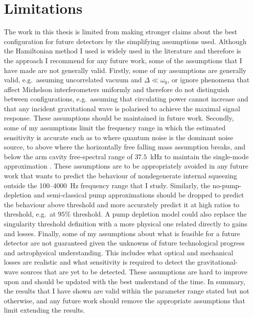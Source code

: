 \section{Limitations}

The work in this thesis is limited from making stronger claims about the best configuration for future detectors by the simplifying assumptions used. Although the Hamiltonian method I used is widely used in the literature and therefore is the approach I recommend for any future work, some of the assumptions that I have made are not generally valid.
Firstly, some of my assumptions are generally valid, e.g.\ assuming uncorrelated vacuum and $\Delta\ll\omega_0$, or ignore phenomena that affect Michelson interferometers uniformly and therefore do not distinguish between configurations, e.g.\ assuming that circulating power cannot increase and that any incident gravitational wave is polarised to achieve the maximal signal response. These assumptions should be maintained in future work.
Secondly, some of my assumptions limit the frequency range in which the estimated sensitivity is accurate such as to where quantum noise is the dominant noise source, to above where  the horizontally free falling mass assumption breaks, and below the arm cavity free-spectral range of $37.5$~kHz to maintain the single-mode approximation . These assumptions are to be appropriately avoided in any future work that wants to predict the behaviour of nondegenerate internal squeezing outside the 100--4000~Hz frequency range that I study. Similarly, the no-pump-depletion and semi-classical pump approximations should be dropped to predict the behaviour above threshold and more accurately predict it at high ratios to threshold, e.g.\ at $95\%$ threshold. A pump depletion model could also replace the singularity threshold definition with a more physical one related directly to gains and losses. 
Finally, some of my assumptions about what is feasible for a future detector are not guaranteed given the unknowns of future technological progress and astrophysical understanding. This includes what optical and mechanical losses are realistic and what sensitivity is required to detect the gravitational-wave sources that are yet to be detected. These assumptions are hard to improve upon and should be updated with the best understand of the time.
In summary, the results that I have shown are valid within the parameter range stated but not otherwise, and any future work should remove the appropriate assumptions that limit extending the results.

